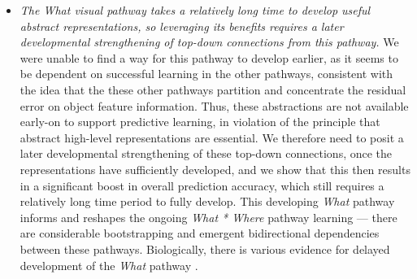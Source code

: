 \documentclass[11pt,twoside]{article}
\newif\myifpdf
\begin{document}
\begin{itemize}
\item \emph{The \emph{What} visual pathway takes a relatively long time to develop useful abstract representations, so leveraging its benefits requires a later developmental strengthening of top-down connections from this pathway.}  We were unable to find a way for this pathway to develop earlier, as it seems to be dependent on successful learning in the other pathways, consistent with the idea that the these other pathways partition and concentrate the residual error on object feature information.  Thus, these abstractions are not available early-on to support predictive learning, in violation of the principle that abstract high-level representations are essential.  We therefore need to posit a later developmental strengthening of these top-down connections, once the representations have sufficiently developed, and we show that this then results in a significant boost in overall prediction accuracy, which still requires a relatively long time period to fully develop.  This developing {\em What} pathway informs and reshapes the ongoing {\em What * Where} pathway learning --- there are considerable bootstrapping and emergent bidirectional dependencies between these pathways.  Biologically, there is various evidence for delayed development of the {\em What} pathway \cite{Rodman94,NishimuraScherfBehrmann09}.


\end{itemize}
\end{document}
